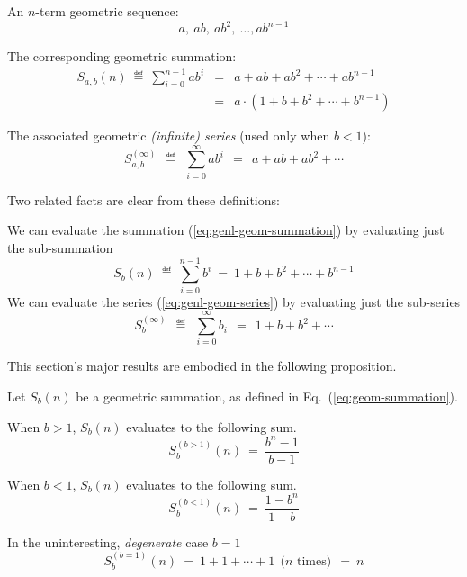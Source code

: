 \medskip

An $n$-term geometric sequence:
\begin{equation}
\label{eq:genl-geom-seq}
a, \ ab, \ ab^2, \ \ldots, ab^{n-1}
\end{equation}

The corresponding geometric summation:
\begin{eqnarray}
\label{eq:genl-geom-summation}
S_{a,b}(n)
 \ \eqdef \  \sum_{i=0}^{n-1} a b^i 
 & = &  a + ab + ab^2 + \cdots + ab^{n-1} \\
\nonumber
 & = & 
 a \cdot (1+ b + b^2 + \cdots + b^{n-1})
\end{eqnarray}

The associated geometric {\em (infinite) series} (used only when $b < 1$):
\begin{equation}
\label{eq:genl-geom-series}
S_{a,b}^{(\infty)} \ \ \eqdef \ \  \sum_{i=0}^\infty a b^i
 \ \  = \ \   a + ab + ab^2 + \cdots 
\end{equation}

\medskip

\noindent
Two related facts are clear from these definitions:

\noindent
We can evaluate the summation (\ref{eq:genl-geom-summation}) by evaluating just the sub-summation
\begin{equation}
\label{eq:geom-summation}
S_{b}(n) \ \eqdef \ \sum_{i=0}^{n-1} b^i \ = \ 1+ b + b^2 + \cdots + b^{n-1}
\end{equation}
We can evaluate the series (\ref{eq:genl-geom-series}) by evaluating just the sub-series
\begin{equation}
\label{eq:geom-series}
S_{b}^{(\infty)} \ \ \eqdef \ \ \sum_{i=0}^\infty b_i \ \ = \ \ 1+ b + b^2 + \cdots 
\end{equation}

\bigskip

This section's major results are embodied in the following proposition.

\begin{prop}
\label{thm:sum-finite-geometric-series}
Let $S_{b}(n)$ be a geometric summation, as defined in Eq.~(\ref{eq:geom-summation}).

\smallskip

When $b > 1$, $S_{b}(n)$ evaluates to the following sum.
\begin{equation}
\label{eq:geom-sum:b>1}
S^{(b>1)}_{b}(n) \ = \ \frac{b^{n}- 1}{b - 1}
\end{equation}

\smallskip

When $b < 1$, $S_{b}(n)$ evaluates to the following sum.
\begin{equation}
\label{eq:geom-sum:b<1}
S^{(b<1)}_{b}(n) \ = \ \frac{1 - b^n}{1-b}
\end{equation}

\smallskip

In the uninteresting, {\em degenerate} case $b=1$
\[ S^{(b=1)}_{b}(n) \ = \ 1 + 1 + \cdots + 1 \ \ \mbox{($n$ times)} \ \ = \ n \]
\end{prop}

